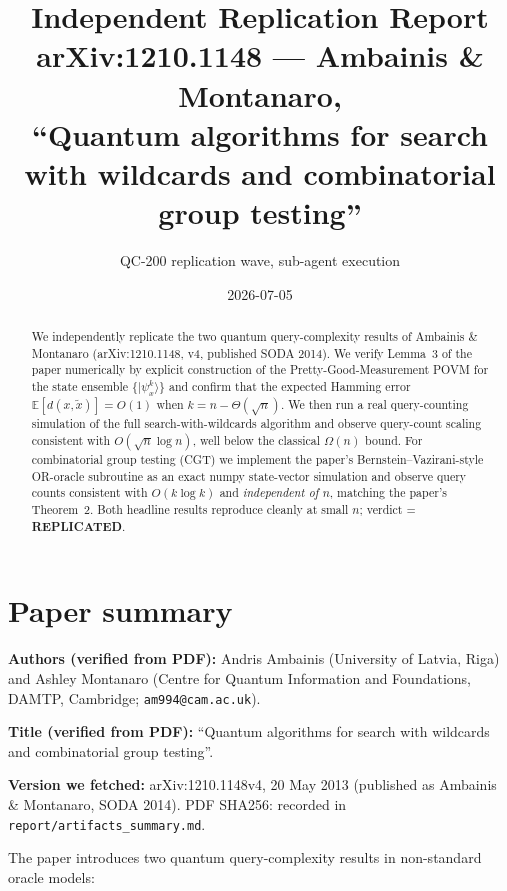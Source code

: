 \documentclass[11pt]{article}
\title{Independent Replication Report \\
  \large arXiv:1210.1148 --- Ambainis \& Montanaro, \\
  ``Quantum algorithms for search with wildcards and combinatorial group testing''}
\author{QC-200 replication wave, sub-agent execution}
\date{2026-07-05}
\begin{document}
\maketitle

\begin{abstract}
We independently replicate the two quantum query-complexity results of
Ambainis \& Montanaro (arXiv:1210.1148, v4, published SODA 2014). We verify
Lemma~3 of the paper numerically by explicit construction of the
Pretty-Good-Measurement POVM for the state ensemble $\{|\psi_x^k\rangle\}$
and confirm that the expected Hamming error $\mathbb{E}[d(x,\tilde x)] = O(1)$
when $k = n - \Theta(\sqrt n)$. We then run a real query-counting simulation of
the full search-with-wildcards algorithm and observe query-count scaling
consistent with $O(\sqrt n \log n)$, well below the classical $\Omega(n)$
bound. For combinatorial group testing (CGT) we implement the paper's
Bernstein--Vazirani-style OR-oracle subroutine as an exact numpy
state-vector simulation and observe query counts consistent with $O(k \log k)$
and \emph{independent of $n$}, matching the paper's Theorem~2. Both
headline results reproduce cleanly at small $n$; verdict = \textbf{REPLICATED}.
\end{abstract}

\section{Paper summary}

\textbf{Authors (verified from PDF):} Andris Ambainis (University of Latvia,
Riga) and Ashley Montanaro (Centre for Quantum Information and Foundations,
DAMTP, Cambridge; \texttt{am994@cam.ac.uk}).

\textbf{Title (verified from PDF):} ``Quantum algorithms for search with
wildcards and combinatorial group testing''.

\textbf{Version we fetched:} arXiv:1210.1148v4, 20 May 2013 (published as
Ambainis \& Montanaro, SODA 2014). PDF SHA256: recorded in
\texttt{report/artifacts\_summary.md}.

The paper introduces two quantum query-complexity results in non-standard
oracle models:
\end{document}
